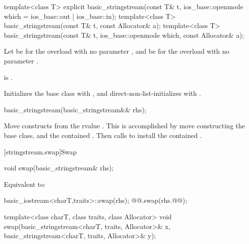 %
\begin{itemdecl}
template<class T>
  explicit basic_stringstream(const T& t, ios_base::openmode which = ios_base::out | ios_base::in);
template<class T>
  basic_stringstream(const T& t, const Allocator& a);
template<class T>
  basic_stringstream(const T& t, ios_base::openmode which, const Allocator& a);
\end{itemdecl}

\begin{itemdescr}
\pnum
Let  be 
for the overload with no parameter , and
 be  for the overload with no parameter .

\pnum
\constraints
{}
is .

\pnum
\effects
Initializes the base class with , and
direct-non-list-initializes  with .
\end{itemdescr}

%
\begin{itemdecl}
basic_stringstream(basic_stringstream&& rhs);
\end{itemdecl}

\begin{itemdescr}
\pnum
\effects
Move constructs from the rvalue . This
is accomplished by move constructing the base class, and the contained
.
Then calls 
to install the contained .
\end{itemdescr}

[stringstream.swap]{Swap}

%
\begin{itemdecl}
void swap(basic_stringstream& rhs);
\end{itemdecl}

\begin{itemdescr}
\pnum
\effects
Equivalent to:
\begin{codeblock}
basic_iostream<charT,traits>::swap(rhs);
@@.swap(rhs.@@);
\end{codeblock}
\end{itemdescr}

%
\begin{itemdecl}
template<class charT, class traits, class Allocator>
  void swap(basic_stringstream<charT, traits, Allocator>& x,
            basic_stringstream<charT, traits, Allocator>& y);
\end{itemdecl}

